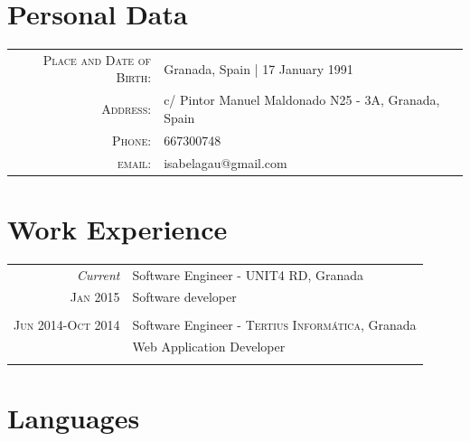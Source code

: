 \documentclass[a4paper,10pt]{article} %
\begin{document}

\section{Personal Data}

\begin{tabular}{rl}
\textsc{Place and Date of Birth:} & Granada, Spain  | 17 January 1991 \\
\textsc{Address:} & c/ Pintor Manuel Maldonado N25 - 3A, Granada, Spain \\
\textsc{Phone:} & 667300748\\
\textsc{email:} & {isabelagau@gmail.com}
\end{tabular}


\section{Work Experience}

\begin{tabular}{r|p{11cm}}
\emph{Current} & Software Engineer - \textsc{UNIT4 RD}, Granada \\
\textsc{Jan 2015} 
& \footnotesize{Software developer}\\
\multicolumn{2}{c}{} \\


\textsc{Jun 2014-Oct 2014} & Software Engineer - \textsc{Tertius Informática},
Granada \emph{}\\
& \footnotesize{Web Application Developer}\\
\multicolumn{2}{c}{} \\


\end{tabular}



\section{Languages}
\end{document}
